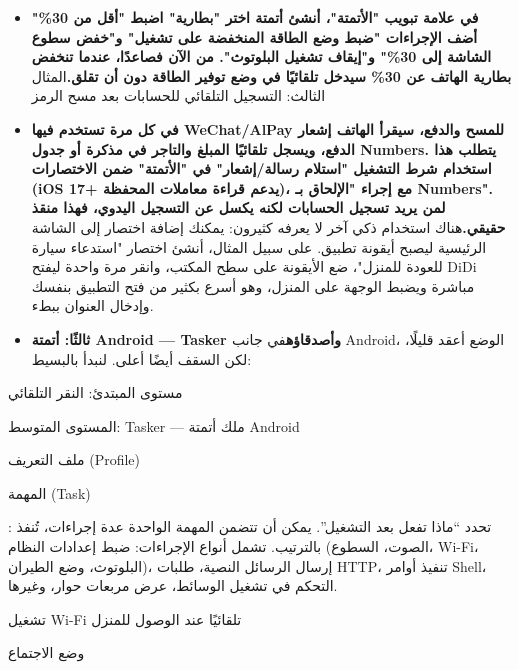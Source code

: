 \begin{itemize}
  \item \textbf{في علامة تبويب "الأتمتة"، أنشئ أتمتة اختر "بطارية" اضبط "أقل من 30\%" أضف الإجراءات "ضبط وضع الطاقة المنخفضة على تشغيل" و"خفض سطوع الشاشة إلى 30\%" و"إيقاف تشغيل البلوتوث". من الآن فصاعدًا، عندما تنخفض بطارية الهاتف عن 30\% سيدخل تلقائيًا في وضع توفير الطاقة دون أن تقلق.}المثال الثالث: التسجيل التلقائي للحسابات بعد مسح الرمز
  \item \textbf{في كل مرة تستخدم فيها WeChat/AlPay للمسح والدفع، سيقرأ الهاتف إشعار الدفع، ويسجل تلقائيًا المبلغ والتاجر في مذكرة أو جدول Numbers. يتطلب هذا استخدام شرط التشغيل "استلام رسالة/إشعار" في "الأتمتة" ضمن الاختصارات (iOS 17+ يدعم قراءة معاملات المحفظة)، مع إجراء "الإلحاق بـ Numbers". لمن يريد تسجيل الحسابات لكنه يكسل عن التسجيل اليدوي، فهذا منقذ حقيقي.}هناك استخدام ذكي آخر لا يعرفه كثيرون: يمكنك إضافة اختصار إلى الشاشة الرئيسية ليصبح أيقونة تطبيق. على سبيل المثال، أنشئ اختصار "استدعاء سيارة للعودة للمنزل"، ضع الأيقونة على سطح المكتب، وانقر مرة واحدة ليفتح DiDi مباشرة ويضبط الوجهة على المنزل، وهو أسرع بكثير من فتح التطبيق بنفسك وإدخال العنوان ببطء.
  \item \textbf{ثالثًا: أتمتة Android — Tasker وأصدقاؤه}في جانب Android، الوضع أعقد قليلًا، لكن السقف أيضًا أعلى. لنبدأ بالبسيط:
\end{itemize}

مستوى المبتدئ: النقر التلقائي


المستوى المتوسط: Tasker — ملك أتمتة Android


ملف التعريف (Profile)


المهمة (Task)

: تحدد “ماذا تفعل بعد التشغيل”. يمكن أن تتضمن المهمة الواحدة عدة إجراءات، تُنفذ بالترتيب. تشمل أنواع الإجراءات: ضبط إعدادات النظام (الصوت، السطوع، Wi-Fi، البلوتوث، وضع الطيران)، إرسال الرسائل النصية، طلبات HTTP، تنفيذ أوامر Shell، التحكم في تشغيل الوسائط، عرض مربعات حوار، وغيرها.


تشغيل Wi-Fi تلقائيًا عند الوصول للمنزل


وضع الاجتماع


